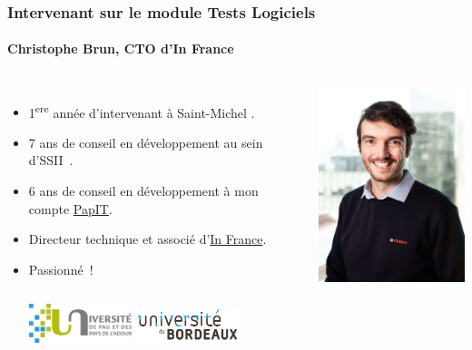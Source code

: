 \documentclass{beamer}
\begin{document}
    \begin{frame}
        \transdissolve
        \frametitle{Intervenant sur le module Tests Logiciels}
        \framesubtitle{Christophe Brun, CTO d'In France}

        \begin{columns}
            \begin{itemize}
                \item 1\textsuperscript{ere} année d’intervenant à Saint-Michel .

                \item 7 ans de conseil en développement au sein d’SSII~.

                \item 6 ans de conseil en développement à mon compte \href{https://papit.fr}{PapIT}.

                \item Directeur technique et associé d’\href{https://in-france.fr}{In France}.

                \item Passionné~!
                \bigbreak
                \begin{columns}
                    \centering
                    \includegraphics[width=3cm]{image/logo-uppa}
                    \centering
                    \includegraphics[width=3cm]{image/logo-universite-bordeaux}
                \end{columns}
            \end{itemize}
            \centering
            \includegraphics[width=5cm]{image/trombine-christophe}
        \end{columns}
    \end{frame}
\end{document}
